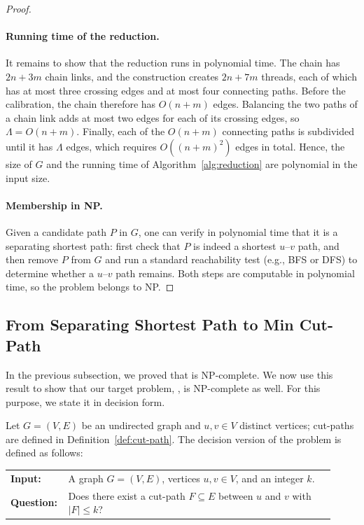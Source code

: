 \begin{proof}
\paragraph{Running time of the reduction.}
It remains to show that the reduction runs in polynomial time.
The chain has $2n+3m$ chain links, and the construction creates $2n+7m$ threads, each of which has at most three crossing edges and at most four connecting paths.
Before the calibration, the chain therefore has $O(n+m)$ edges.
Balancing the two paths of a chain link adds at most two edges for each of its crossing edges, so $\Lambda = O(n+m)$.
Finally, each of the $O(n+m)$ connecting paths is subdivided until it has $\Lambda$ edges, which requires $O((n+m)^2)$ edges in total.
Hence, the size of $G$ and the running time of Algorithm~\ref{alg:reduction} are polynomial in the input size.

\paragraph{Membership in NP.}
Given a candidate path $P$ in $G$, one can verify in polynomial time that it is a separating shortest path:
first check that $P$ is indeed a shortest $u$--$v$ path, and then remove $P$ from $G$ and run a standard reachability test (e.g., BFS or DFS) to determine whether a $u$--$v$ path remains.
Both steps are computable in polynomial time, so the \SSP{} problem belongs to NP.
\end{proof}

\subsection{From Separating Shortest Path to Min Cut-Path}\label{sec:ssp-to-mcp}
In the previous subsection, we proved that \SSP{} is NP-complete.
We now use this result to show that our target problem, \MinCutPath, is NP-complete as well.
For this purpose, we state it in decision form.

\begin{problem}
Let $G=(V,E)$ be an undirected graph and $u,v \in V$ distinct vertices; cut-paths are defined in Definition~\ref{def:cut-path}.
The decision version of the \MinCutPath{} problem is defined as follows:

\begin{center}
\begin{tabular}{p{0.12\linewidth}p{0.8\linewidth}}
\textbf{Input:} & A graph $G=(V,E)$, vertices $u,v \in V$, and an integer $k$. \\
\textbf{Question:} & Does there exist a cut-path $F \subseteq E$ between $u$ and $v$ with $|F|\leq k$?
\end{tabular}
\end{center}
\end{problem}

